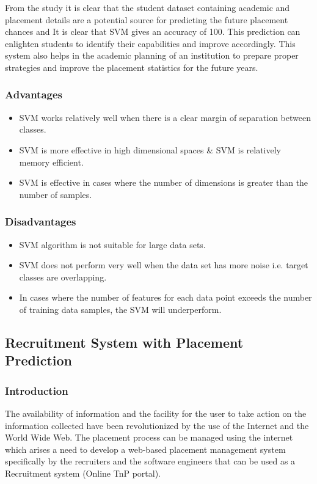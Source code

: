 \documentclass[12pt]{article}
\begin{document}
From the study it is clear that the student dataset containing academic and placement details are a potential source for 
predicting the future placement chances and It is clear that SVM gives an accuracy of 100. This prediction can enlighten 
students to identify their capabilities and improve accordingly. This system also helps in the academic planning of an 
institution to prepare proper strategies and improve the placement statistics for the future years.

\newpage

\subsubsection{Advantages}
\begin{itemize}
\item SVM works relatively well when there is a clear margin of separation between classes.
\item SVM is more effective in high dimensional spaces \& SVM is relatively memory efficient.
\item SVM is effective in cases where the number of dimensions is greater than the number of samples.
\end{itemize}
\vspace{10px}
\subsubsection{Disadvantages}
\begin{itemize}
\item SVM algorithm is not suitable for large data sets.
\item SVM does not perform very well when the data set has more noise i.e. target classes are overlapping. 
\item In cases where the number of features for each data point exceeds the number of training data samples, the SVM will underperform.
\end{itemize}
\vspace{10px}

\newpage
\subsection{Recruitment System with Placement Prediction}
\subsubsection{Introduction}
The availability of information and the 
facility for the user to take action on the information 
collected have been revolutionized by the use of the 
Internet and the World Wide Web. The placement 
process can be managed using the internet which 
arises a need to develop a web-based placement 
management system specifically by the recruiters and 
the software engineers that can be used as a 
Recruitment system (Online TnP portal). 
\end{document}
